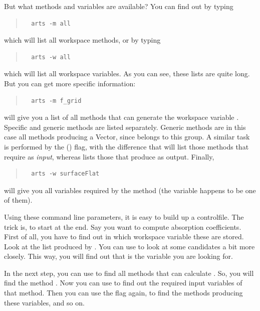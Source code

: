 But what methods and variables are available? You can find out by
typing
\begin{quote}
\begin{verbatim}
  arts -m all
\end{verbatim}
\end{quote}
which will list all workspace methods, or by typing 
\begin{quote}
\begin{verbatim}
  arts -w all
\end{verbatim}
\end{quote}
which will list all workspace variables. As you can see, these lists
are quite long. But you can get more specific information:
\begin{quote}
\begin{verbatim}
  arts -m f_grid
\end{verbatim}
\end{quote}
will give you a list of all methods that can generate the workspace
variable . Specific and generic methods are listed
separately. Generic methods are in this case all methods producing a
Vector, since  belongs to this group. A similar task is
performed by the  () flag, with the difference
that  will list those methods that require
 as \emph{input}, whereas  lists
those that produce  as output. Finally,
\begin{quote}
\begin{verbatim}
  arts -w surfaceFlat
\end{verbatim}
\end{quote}
will give you all variables required by the method 
(the variable  happens to be one of them).

Using these command line parameters, it is easy to build up a
controlfile. The trick is, to start at the end. Say you want to
compute absorption coefficients. First of all, you have to find out
in which workspace variable these are stored. Look at the list
produced by . You can use  to look at
some candidates a bit more closely. This way, you will find out that
 is the variable you are looking for.

In the next step, you can use  to find all methods
that can calculate . So, you will find the method
. Now you can use  to find out the
required input variables of that method. Then you can use the
 flag again, to find the methods producing these variables,
and so on.

